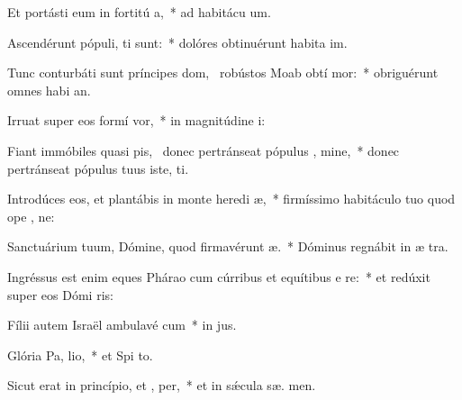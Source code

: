 \item Et portásti eum in fortitú a,~* ad habitácu  um.
\item Ascendérunt pópuli,  ti sunt:~* dolóres obtinuérunt habita im.
\item Tunc conturbáti sunt príncipes dom,~\pscross{} robústos Moab obtí mor:~* obriguérunt omnes habi an.
\item Irruat super eos formí  vor,~* in magnitúdine  i:
\item Fiant immóbiles quasi pis,~\pscross{} donec pertránseat pópulus , mine,~* donec pertránseat pópulus tuus iste,  ti.
\item Introdúces eos, et plantábis in monte heredi æ,~* firmíssimo habitáculo tuo quod ope , ne:
\item Sanctuárium tuum, Dómine, quod firmavérunt  æ.~* Dóminus regnábit in æ  tra.
\item Ingréssus est enim eques Phárao cum cúrribus et equítibus e  re:~* et redúxit super eos Dómi  ris:
\item Fílii autem Israël ambulavé  cum~* in  jus.
\item Glória Pa,  lio,~* et Spi to.
\item Sicut erat in princípio, et ,  per,~* et in sǽcula sæ. men.

